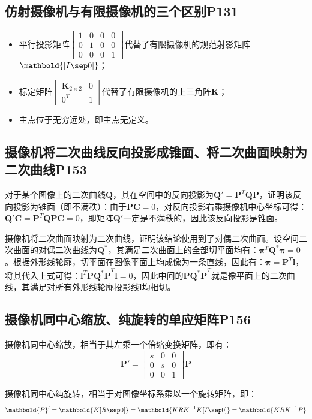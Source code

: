 \documentclass[11pt]{article}
\begin{document}
\subsection{仿射摄像机与有限摄像机的三个区别P131}
\begin{itemize}
  \item 平行投影矩阵$\begin{bmatrix}
            1 & 0 & 0 & 0 \\
            0 & 1 & 0 & 0 \\
            0 & 0 & 0 & 1
          \end{bmatrix}$代替了有限摄像机的规范射影矩阵$\mathbold{[I\sep 0]}$；
  \item 标定矩阵$\begin{bmatrix}
            \mathbold{K}_{2\times2} & 0 \\
            0^T                     & 1
          \end{bmatrix}$代替了有限摄像机的上三角阵$\mathbold{K}$；
  \item 主点位于无穷远处，即主点无定义。
\end{itemize}
\subsection{摄像机将二次曲线反向投影成锥面、将二次曲面映射为二次曲线P153}
对于某个图像上的二次曲线$\mathbold{Q}$，其在空间中的反向投影为$\mathbold{Q}'=\mathbold{P}^T\mathbold{QP}$，证明该反向投影为锥面（即不满秩）：由于$\mathbold{PC}=0$，对反向投影右乘摄像机中心坐标可得：$\mathbold{Q}'\mathbold{C}=\mathbold{P}^T\mathbold{QPC}=0$，即矩阵$\mathbold{Q}'$一定是不满秩的，因此该反向投影是锥面。\par
摄像机将二次曲面映射为二次曲线，证明该结论使用到了对偶二次曲面。设空间二次曲面的对偶二次曲线为$\mathbold{Q}^*$，其满足二次曲面上的全部切平面均有：$\mathbold{\pi}^T\mathbold{Q}^*\mathbold{\pi}=0$。根据外形线轮廓，切平面在图像平面上均成像为一条直线，因此有：$\mathbold{\pi}=\mathbold{P}^T\mathbold{l}$，将其代入上式可得：$\mathbold{l}^T\mathbold{PQ^*P}^T\mathbold{l}=0$，因此中间的$\mathbold{PQ^*P}^T$就是像平面上的二次曲线，其满足对所有外形线轮廓投影线$\mathbold{l}$均相切。
\subsection{摄像机同中心缩放、纯旋转的单应矩阵P156}
摄像机同中心缩放，相当于其左乘一个倍缩变换矩阵，即有：
\begin{equation*}
  \mathbold{P}'=\begin{bmatrix}
    s & 0 & 0 \\
    0 & s & 0 \\
    0 & 0 & 1
  \end{bmatrix}\mathbold{P}
\end{equation*}\par
摄像机同中心纯旋转，相当于对图像坐标系乘以一个旋转矩阵，即：
\begin{equation*}
  \mathbold{P}'=\mathbold{K[R\sep 0]}=\mathbold{KRK^{-1}K[I\sep 0]}=\mathbold{KRK^{-1}P}
\end{equation*}\par
\end{document}
